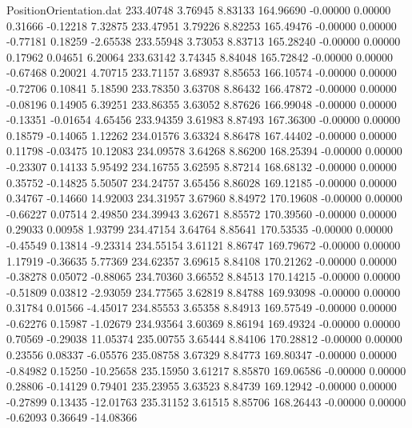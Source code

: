 \begin{filecontents}{PositionOrientation.dat}
 233.40748    3.76945    8.83133   164.96690   -0.00000    0.00000    0.31666   -0.12218    7.32875
 233.47951    3.79226    8.82253   165.49476   -0.00000    0.00000   -0.77181    0.18259   -2.65538
 233.55948    3.73053    8.83713   165.28240   -0.00000    0.00000    0.17962    0.04651    6.20064
 233.63142    3.74345    8.84048   165.72842   -0.00000    0.00000   -0.67468    0.20021    4.70715
 233.71157    3.68937    8.85653   166.10574   -0.00000    0.00000   -0.72706    0.10841    5.18590
 233.78350    3.63708    8.86432   166.47872   -0.00000    0.00000   -0.08196    0.14905    6.39251
 233.86355    3.63052    8.87626   166.99048   -0.00000    0.00000   -0.13351   -0.01654    4.65456
 233.94359    3.61983    8.87493   167.36300   -0.00000    0.00000    0.18579   -0.14065    1.12262
 234.01576    3.63324    8.86478   167.44402   -0.00000    0.00000    0.11798   -0.03475   10.12083
 234.09578    3.64268    8.86200   168.25394   -0.00000    0.00000   -0.23307    0.14133    5.95492
 234.16755    3.62595    8.87214   168.68132   -0.00000    0.00000    0.35752   -0.14825    5.50507
 234.24757    3.65456    8.86028   169.12185   -0.00000    0.00000    0.34767   -0.14660   14.92003
 234.31957    3.67960    8.84972   170.19608   -0.00000    0.00000   -0.66227    0.07514    2.49850
 234.39943    3.62671    8.85572   170.39560   -0.00000    0.00000    0.29033    0.00958    1.93799
 234.47154    3.64764    8.85641   170.53535   -0.00000    0.00000   -0.45549    0.13814   -9.23314
 234.55154    3.61121    8.86747   169.79672   -0.00000    0.00000    1.17919   -0.36635    5.77369
 234.62357    3.69615    8.84108   170.21262   -0.00000    0.00000   -0.38278    0.05072   -0.88065
 234.70360    3.66552    8.84513   170.14215   -0.00000    0.00000   -0.51809    0.03812   -2.93059
 234.77565    3.62819    8.84788   169.93098   -0.00000    0.00000    0.31784    0.01566   -4.45017
 234.85553    3.65358    8.84913   169.57549   -0.00000    0.00000   -0.62276    0.15987   -1.02679
 234.93564    3.60369    8.86194   169.49324   -0.00000    0.00000    0.70569   -0.29038   11.05374
 235.00755    3.65444    8.84106   170.28812   -0.00000    0.00000    0.23556    0.08337   -6.05576
 235.08758    3.67329    8.84773   169.80347   -0.00000    0.00000   -0.84982    0.15250  -10.25658
 235.15950    3.61217    8.85870   169.06586   -0.00000    0.00000    0.28806   -0.14129    0.79401
 235.23955    3.63523    8.84739   169.12942   -0.00000    0.00000   -0.27899    0.13435  -12.01763
 235.31152    3.61515    8.85706   168.26443   -0.00000    0.00000   -0.62093    0.36649  -14.08366

\end{filecontents}
